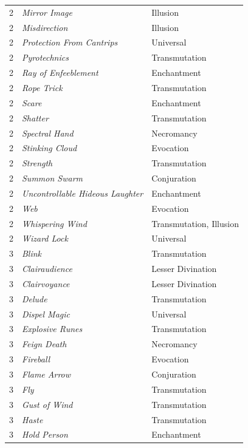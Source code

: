 \begin{multicols}{2}
\begin{tabular}{|p{}|p{}|p{}|}
\rowcolor[gray]{.9}2	& \textit{Mirror Image}	& Illusion \\
2	& \textit{Misdirection}	& Illusion \\
\rowcolor[gray]{.9}2	& \textit{Protection From Cantrips}	& Universal \\
2	& \textit{Pyrotechnics}	& Transmutation \\
\rowcolor[gray]{.9}2	& \textit{Ray of Enfeeblement}	& Enchantment \\
2	& \textit{Rope Trick}	& Transmutation \\
\rowcolor[gray]{.9}2	& \textit{Scare}	& Enchantment \\
2	& \textit{Shatter}	& Transmutation \\
\rowcolor[gray]{.9}2	& \textit{Spectral Hand}	& Necromancy \\
2	& \textit{Stinking Cloud}	& Evocation \\
\rowcolor[gray]{.9}2	& \textit{Strength}	& Transmutation \\
2	& \textit{Summon Swarm}	& Conjuration \\
\rowcolor[gray]{.9}2	& \textit{Uncontrollable Hideous Laughter}	& Enchantment \\
2	& \textit{Web}	& Evocation \\
\rowcolor[gray]{.9}2	& \textit{Whispering Wind}	& Transmutation, Illusion \\
2	& \textit{Wizard Lock}	& Universal \\
\rowcolor[gray]{.9}3	& \textit{Blink}	& Transmutation \\
3	& \textit{Clairaudience}	& Lesser Divination \\
\rowcolor[gray]{.9}3	& \textit{Clairvoyance}	& Lesser Divination \\
3	& \textit{Delude}	& Transmutation \\
\rowcolor[gray]{.9}3	& \textit{Dispel Magic}	& Universal \\
3	& \textit{Explosive Runes}	& Transmutation \\
\rowcolor[gray]{.9}3	& \textit{Feign Death}	& Necromancy \\
3	& \textit{Fireball}	& Evocation \\
\rowcolor[gray]{.9}3	& \textit{Flame Arrow}	& Conjuration \\
3	& \textit{Fly}	& Transmutation \\
\rowcolor[gray]{.9}3	& \textit{Gust of Wind}	& Transmutation \\
3	& \textit{Haste}	& Transmutation \\
\rowcolor[gray]{.9}3	& \textit{Hold Person}	& Enchantment \\

\end{tabular}
\end{multicols}
